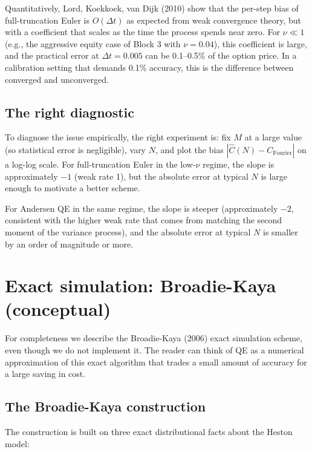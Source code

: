 \documentclass[11pt]{article}
\theoremstyle{plain}
\theoremstyle{definition}
\theoremstyle{remark}
\begin{document}
Quantitatively, Lord, Koekkoek, van Dijk (2010) show that the per-step bias of full-truncation Euler is $O(\Delta t)$ as expected from weak convergence theory, but with a coefficient that scales as the time the process spends near zero. For $\nu \ll 1$ (e.g., the aggressive equity case of Block 3 with $\nu = 0.04$), this coefficient is large, and the practical error at $\Delta t = 0.005$ can be 0.1--0.5\% of the option price. In a calibration setting that demands 0.1\% accuracy, this is the difference between converged and unconverged.

\subsection{The right diagnostic}

To diagnose the issue empirically, the right experiment is: fix $M$ at a large value (so statistical error is negligible), vary $N$, and plot the bias $|\widehat C(N) - C_{\mathrm{Fourier}}|$ on a log-log scale. For full-truncation Euler in the low-$\nu$ regime, the slope is approximately $-1$ (weak rate 1), but the absolute error at typical $N$ is large enough to motivate a better scheme.

For Andersen QE in the same regime, the slope is steeper (approximately $-2$, consistent with the higher weak rate that comes from matching the second moment of the variance process), and the absolute error at typical $N$ is smaller by an order of magnitude or more.

\section{Exact simulation: Broadie-Kaya (conceptual)}

For completeness we describe the Broadie-Kaya (2006) exact simulation scheme, even though we do not implement it. The reader can think of QE as a numerical approximation of this exact algorithm that trades a small amount of accuracy for a large saving in cost.

\subsection{The Broadie-Kaya construction}

The construction is built on three exact distributional facts about the Heston model:
\end{document}

